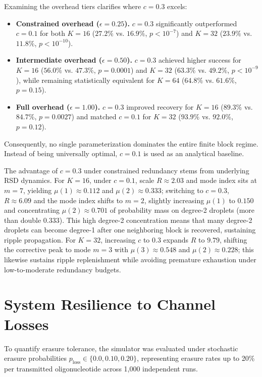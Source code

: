 Examining the overhead tiers clarifies where $c = 0.3$ excels:
\begin{itemize}
    \item \textbf{Constrained overhead ($\epsilon = 0.25$).} $c = 0.3$ significantly outperformed $c = 0.1$ for both $K = 16$ ($27.2\%$ vs. $16.9\%$, $p < 10^{-7}$) and $K = 32$ ($23.9\%$ vs. $11.8\%$, $p < 10^{-10}$).
    \item \textbf{Intermediate overhead ($\epsilon = 0.50$).} $c = 0.3$ achieved higher success for $K = 16$ ($56.0\%$ vs. $47.3\%$, $p = 0.0001$) and $K = 32$ ($63.3\%$ vs. $49.2\%$, $p < 10^{-9}$), while remaining statistically equivalent for $K = 64$ ($64.8\%$ vs. $61.6\%$, $p = 0.15$).
    \item \textbf{Full overhead ($\epsilon = 1.00$).} $c = 0.3$ improved recovery for $K = 16$ ($89.3\%$ vs. $84.7\%$, $p = 0.0027$) and matched $c = 0.1$ for $K = 32$ ($93.9\%$ vs. $92.0\%$, $p = 0.12$).
\end{itemize}
Consequently, no single parameterization dominates the entire finite block regime. Instead of being universally optimal, $c = 0.1$ is used as an analytical baseline.

The advantage of $c = 0.3$ under constrained redundancy stems from underlying RSD dynamics. For $K = 16$, under $c = 0.1$, scale $R \approx 2.03$ and mode index sits at $m = 7$, yielding $\mu(1) \approx 0.112$ and $\mu(2) \approx 0.333$; switching to $c = 0.3$, $R \approx 6.09$ and the mode index shifts to $m = 2$, slightly increasing $\mu(1)$ to $0.150$ and concentrating $\mu(2) \approx 0.701$ of probability mass on degree-2 droplets (more than double $0.333$). This high degree-2 concentration means that many degree-2 droplets can become degree-1 after one neighboring block is recovered, sustaining ripple propagation. For $K = 32$, increasing $c$ to $0.3$ expands $R$ to $9.79$, shifting the corrective peak to mode $m = 3$ with $\mu(3) \approx 0.548$ and $\mu(2) \approx 0.228$; this likewise sustains ripple replenishment while avoiding premature exhaustion under low-to-moderate redundancy budgets.

\section{System Resilience to Channel Losses}
\label{sec:results_system_resilience}

To quantify erasure tolerance, the simulator was evaluated under stochastic erasure probabilities $p_{\text{loss}} \in \{0.0, 0.10, 0.20\}$, representing erasure rates up to 20\% per transmitted oligonucleotide across 1,000 independent runs.

